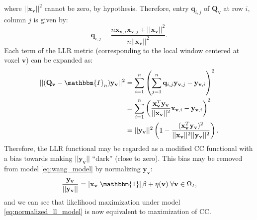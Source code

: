 where $||\mathbf{x}_{\mathbf{v}}||^{2}$ cannot be zero, by hypothesis. Therefore, entry $\mathbf{q}_{i,j}$ of $\mathbf{Q}_{\mathbf{v}}$ at row $i$, column $j$ is given by:
\vspace{-0.3cm}
\begin{displaymath}
    \mathbf{q}_{i,j} = \frac{n\mathbf{x}_{\mathbf{v},i}\mathbf{x}_{\mathbf{v}, j} + ||\mathbf{x}_{\mathbf{v}}||^{2}}{n||\mathbf{x}_{\mathbf{v}}||^{2}}.
\end{displaymath}
Each term of the LLR metric (corresponding to the local window centered at voxel $\mathbf{v}$) can be expanded as:
\begin{equation}\label{eq:llr_cc_relationship}
    \begin{split}
        ||(\mathbf{Q}_{\mathbf{v}} - \mathbbm{I}_{n})\mathbf{y}_{\mathbf{v}}||^{2} &= \sum_{i=1}^{n} \left(\sum_{j=1}^{n} \mathbf{q}_{i,j} \mathbf{y}_{\mathbf{v}, j} - \mathbf{y}_{\mathbf{v},i}\right)^{2}\\
        &=\sum_{i=1}^{n}\left(\frac{\mathbf{x}_{\mathbf{v}}^{T}\mathbf{y}_{\mathbf{v}}}{||\mathbf{x}_{\mathbf{v}}||^{2}} \mathbf{x}_{\mathbf{v}, i} - \mathbf{y}_{\mathbf{v},i}\right)^{2} \\
        &= ||\mathbf{y}_{\mathbf{v}}||^{2}\left(1 - \frac{(\mathbf{x}_{\mathbf{v}}^{T}\mathbf{y}_{\mathbf{v}})^{2}}{||\mathbf{x}_{\mathbf{v}}||^{2}||\mathbf{y}_{\mathbf{v}}||^{2}}\right).
    \end{split}
\end{equation}
Therefore, the LLR functional may be regarded as a modified CC functional with a bias towards making $||\mathbf{y}_{\mathbf{v}}||$ ``dark'' (close to zero). This bias may be removed from model \eqref{eq:wang_model} by normalizing $\mathbf{y}_{\mathbf{v}}$:\\
\begin{equation}\label{eq:normalized_ll_model}
    \frac{\mathbf{y}_{\mathbf{v}}}{||\mathbf{y}_{\mathbf{v}}||} = \left[\mathbf{x}_{\mathbf{v}} \; \mathbbm{1}\right]\beta + \eta(\mathbf{v}) \; \forall \mathbf{v}\in\Omega_{I},
\end{equation}
and we can see that likelihood maximization under model \eqref{eq:normalized_ll_model} is now equivalent to maximization of CC.\\

